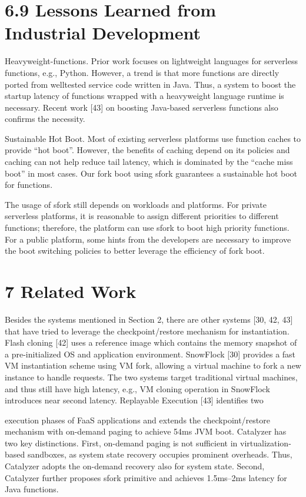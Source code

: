 \documentclass[
  10
]{article}
\begin{document}
\section{6.9 Lessons Learned from Industrial
Development}\label{lessons-learned-from-industrial-development}

Heavyweight-functions. Prior work focuses on lightweight languages for
serverless functions, e.g., Python. However, a trend is that more
functions are directly ported from welltested service code written in
Java. Thus, a system to boost the startup latency of functions wrapped
with a heavyweight language runtime is necessary. Recent work {[}43{]}
on boosting Java-based serverless functions also confirms the necessity.

Sustainable Hot Boot. Most of existing serverless platforms use function
caches to provide ``hot boot''. However, the benefits of caching depend
on its policies and caching can not help reduce tail latency, which is
dominated by the ``cache miss boot'' in most cases. Our fork boot using
sfork guarantees a sustainable hot boot for functions.

The usage of sfork still depends on workloads and platforms. For private
serverless platforms, it is reasonable to assign different priorities to
different functions; therefore, the platform can use sfork to boot high
priority functions. For a public platform, some hints from the
developers are necessary to improve the boot switching policies to
better leverage the efficiency of fork boot.

\section{7 Related Work}\label{related-work}

Besides the systems mentioned in Section 2, there are other systems
{[}30, 42, 43{]} that have tried to leverage the checkpoint/restore
mechanism for instantiation. Flash cloning {[}42{]} uses a reference
image which contains the memory snapshot of a pre-initialized OS and
application environment. SnowFlock {[}30{]} provides a fast VM
instantiation scheme using VM fork, allowing a virtual machine to fork a
new instance to handle requests. The two systems target traditional
virtual machines, and thus still have high latency, e.g., VM cloning
operation in SnowFlock introduces near second latency. Replayable
Execution {[}43{]} identifies two

execution phases of FaaS applications and extends the checkpoint/restore
mechanism with on-demand paging to achieve 54ms JVM boot. Catalyzer has
two key distinctions. First, on-demand paging is not sufficient in
virtualization-based sandboxes, as system state recovery occupies
prominent overheads. Thus, Catalyzer adopts the on-demand recovery also
for system state. Second, Catalyzer further proposes sfork primitive and
achieves 1.5ms--2ms latency for Java functions.
\end{document}
